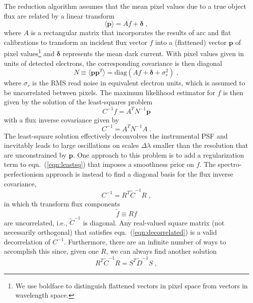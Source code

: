 \documentclass[12pt]{article}
\providecommand{\eqn}[1]{eqn.~(\ref{eqn:#1})}
\providecommand{\vecsymbol}[1]{\ensuremath{\boldsymbol{#1}}}
\providecommand{\pv}{\vecsymbol{p}}
\providecommand{\deltav}{\vecsymbol{\delta}}
\begin{document}
The reduction algorithm assumes that the mean pixel values due to a true object flux are related by a linear transform
\begin{equation}
\langle \pv \rangle = A f + \deltav \; ,
\end{equation}
where $A$ is a rectangular matrix that incorporates the results of arc and flat calibrations to transform an incident flux vector $f$ into a (flattened) vector $\pv$ of pixel values\footnote{We use boldface to distinguish flattened vectors in pixel space from vectors in wavelength space.} and $\deltav$ represents the mean dark current. With pixel values given in units of detected electrons, the corresponding covariance is then diagonal
\begin{equation}
N \equiv \langle\pv \pv^T\rangle = \text{diag}\left( A f + \deltav + \sigma^2_{r} \right) \; ,
\end{equation}
where $\sigma_r$ is the RMS read noise in equivalent electron units, which is assumed to be uncorrelated between pixels. The maximum likelihood estimator for $f$ is then given by the solution of the least-squares problem
\begin{equation}
C^{-1} f = A^T N^{-1} \pv
\label{eqn:leastsq}
\end{equation}
with a flux inverse covariance given by
\begin{equation}
C^{-1} = A^T N^{-1} A \; .
\end{equation}
The least-square solution effectively deconvolves the instrumental PSF and inevitably leads to large oscillations on scales $\Delta\lambda$ smaller than the resolution that are unconstrained by $\pv$. One approach to this problem is to add a regularization term to \eqn{leastsq} that imposes a smoothness prior on $f$.  The spectro-perfectionism approach is instead to find a diagonal basis for the flux inverse covariance,
\begin{equation}
C^{-1} = R^T \tilde{C}^{-1} R \; ,
\label{eqn:decorrelated}
\end{equation}
in which th transform flux components
\begin{equation}
\tilde{f} \equiv R f
\end{equation}
are uncorrelated, i.e., $\tilde{C}^{-1}$ is diagonal. Any real-valued square matrix (not necessarily orthogonal) that satisfies \eqn{decorrelated} is a valid decorrelation of $C^{-1}$. Furthermore, there are an infinite number of ways to accomplish this since, given one $R$, we can always find another solution
\begin{equation}
R^T \tilde{C}^{-1} R = S^T \tilde{D}^{-1} S \; ,
\end{equation}
\end{document}

